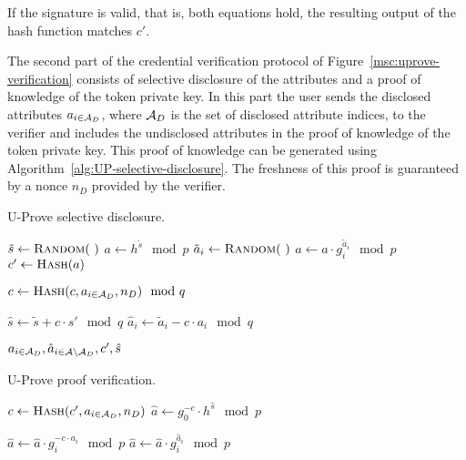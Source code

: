 If the signature is valid, that is, both equations hold, the resulting output of
the hash function matches $c'$.

The second part of the credential verification protocol of
Figure~\ref{msc:uprove-verification} consists of selective disclosure of the
attributes and a proof of knowledge of the token private key. In this part the
user sends the disclosed attributes $a_{i \in \mathcal{A}_D}$, where $\mathcal{A}_D$ is the set
of disclosed attribute indices, to the verifier and includes the undisclosed
attributes in the proof of knowledge of the token private key. This proof of
knowledge can be generated using Algorithm~\ref{alg:UP-selective-disclosure}.
The freshness of this proof is guaranteed by a nonce $n_D$ provided by the
verifier.

\begin{algorithm}
  \caption{U-Prove selective disclosure.}
  \label{alg:UP-selective-disclosure}
  \addtolength{\baselineskip}{1mm}
  \begin{algorithmic}[1]
      \State $\tilde{s} \gets \Call{Random}{~}$
      \State $a \gets h^{\tilde{s}} \mod p$
        \State $\tilde{a}_i \gets \Call{Random}{~}$
        \State $a \gets a \cdot g_i^{\tilde{a}_i} \mod p$
      \EndFor
      \State $c' \gets \Call{Hash}{a}$

      \State $c \gets \Call{Hash}{c, a_{i \in \A_D}, n_D} \mod q$

      \State $\hat{s} \gets \tilde{s} + c \cdot s' \mod q$
        \State $\hat{a}_i \gets \tilde{a}_i - c \cdot a_i \mod q$
      \EndFor

      \Return $a_{i \in \mathcal{A}_D}, \hat{a}_{i \in \mathcal{A} \setminus \mathcal{A}_D}, c', \hat{s}$
    \EndFunction
  \end{algorithmic}
\end{algorithm}

\begin{algorithm}
  \caption{U-Prove proof verification.}
  \label{alg:UP-verify-proof}
  \addtolength{\baselineskip}{1mm}
  \begin{algorithmic}[1]
      \State $c \gets \Call{Hash}{c', a_{i \in \A_D}, n_D}$
      \State $\hat{a} \gets g_0^{-c} \cdot h^{\hat{s}} \mod p$

        \State $\hat{a} \gets \hat{a} \cdot g_i^{-c \cdot a_i} \mod p$
      \EndFor
        \State $\hat{a} \gets \hat{a} \cdot g_i^{\hat{a}_i} \mod p$
      \EndFor

        \Return {}
      \EndIf

      \Return {}
    \EndFunction
  \end{algorithmic}
\end{algorithm}

